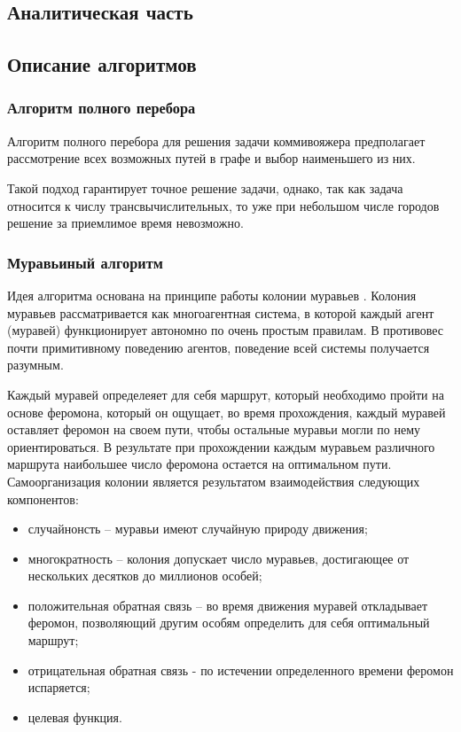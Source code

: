 \documentclass[a4paper,12pt]{article}
\begin{document}
    \begin{center}
        \section{Аналитическая часть}
	    \subsection{Описание алгоритмов}
    \end{center}
\subsubsection{Алгоритм полного перебора}


Алгоритм полного перебора для решения задачи коммивояжера предполагает рассмотрение всех возможных путей в графе и выбор наименьшего из них.

Такой подход гарантирует точное решение задачи, однако, так как задача относится к числу трансвычислительных, то уже при небольшом числе городов решение за приемлимое время невозможно.

\subsubsection{Муравьиный алгоритм}

Идея алгоритма основана на принципе работы колонии муравьев \cite{litlink3}. Колония муравьев рассматривается как многоагентная система, в которой каждый агент (муравей) функционирует автономно по очень простым правилам. В противовес почти примитивному поведению агентов, поведение всей системы получается разумным.
			 
			 Каждый муравей определеяет для себя маршрут, который необходимо пройти на основе феромона, который он ощущает, во время прохождения, каждый муравей оставляет феромон на своем пути, чтобы остальные муравьи могли по нему ориентироваться. В результате при прохождении каждым муравьем различного маршрута наибольшее число феромона остается на оптимальном пути. 			 \\			 
			 Самоорганизация колонии является результатом взаимодействия следующих компонентов:			 
			 \begin{itemize}
			 	\item случайнонсть -- муравьи имеют случайную природу движения;
			 	\item многократность -- колония допускает число муравьев, достигающее от нескольких десятков до миллионов особей;
			 	\item положительная обратная связь -- во время движения муравей откладывает феромон, позволяющий другим особям определить для себя оптимальный маршрут;
			 	\item отрицательная обратная связь - по истечении определенного времени феромон испаряется;
			 	\item целевая функция. 
			 \end{itemize}
\end{document}
